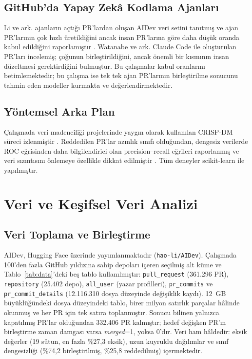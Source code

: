 \documentclass[conference]{IEEEtran}
\begin{document}
\subsection{GitHub'da Yapay Zekâ Kodlama Ajanları}
Li ve ark. ajanların açtığı PR'lardan oluşan AIDev veri setini tanıtmış ve ajan PR'larının çok hızlı üretildiğini ancak insan PR'larına göre daha düşük oranda kabul edildiğini raporlamıştır \cite{li2025rise, li2026aidev}. Watanabe ve ark. \cite{watanabe2025agentic} Claude Code ile oluşturulan PR'ları incelemiş; çoğunun birleştirildiğini, ancak önemli bir kısmının insan düzeltmesi gerektirdiğini bulmuştur. Bu çalışmalar kabul oranlarını betimlemektedir; bu çalışma ise tek tek ajan PR'larının birleştirilme sonucunu tahmin eden modeller kurmakta ve değerlendirmektedir.

\subsection{Yöntemsel Arka Plan}
Çalışmada veri madenciliği projelerinde yaygın olarak kullanılan CRISP-DM süreci izlenmiştir \cite{schroer2021crisp}. Reddedilen PR'lar azınlık sınıfı olduğundan, dengesiz verilerde ROC eğrisinden daha bilgilendirici olan precision--recall eğrileri raporlanmış \cite{saito2015precision} ve veri sızıntısını önlemeye özellikle dikkat edilmiştir \cite{kaufman2012leakage}. Tüm deneyler scikit-learn \cite{pedregosa2011scikit} ile yapılmıştır.

\section{Veri ve Keşifsel Veri Analizi}
\subsection{Veri Toplama ve Birleştirme}
AIDev, Hugging Face üzerinde yayımlanmaktadır (\texttt{hao-li/AIDev}). Çalışmada 100'den fazla GitHub yıldızına sahip depoları içeren seçilmiş alt küme ve Tablo~\ref{tab:data}'deki beş tablo kullanılmıştır: \texttt{pull\_request} (361.296 PR), \texttt{repository} (25.402 depo), \texttt{all\_user} (yazar profilleri), \texttt{pr\_commits} ve \texttt{pr\_commit\_details} (12.116.310 dosya düzeyinde değişiklik kaydı). 12~GB büyüklüğündeki dosya düzeyindeki tablo, birer milyon satırlık parçalar hâlinde okunmuş ve her PR için tek satıra toplanmıştır. Sonucu bilinen yalnızca kapatılmış PR'lar olduğundan 332.406 PR kalmıştır; hedef değişken PR'ın birleştirme zaman damgası varsa \textit{merged}=1, yoksa 0'dır. Veri ham hâldedir: eksik değerler (19 sütun, en fazla \%27,3 eksik), uzun kuyruklu dağılımlar ve sınıf dengesizliği (\%74,2 birleştirilmiş, \%25,8 reddedilmiş) içermektedir.
\end{document}
